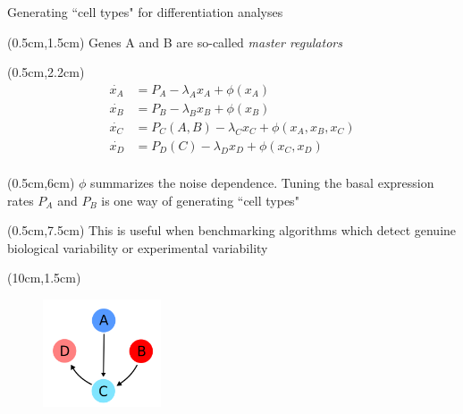 \documentclass[aspectratio=1610]{beamer}					%
\begin{document}
\begin{frame}{Generating ``cell types" for differentiation analyses}

\begin{textblock*}{10cm}(0.5cm,1.5cm)
Genes A and B are so-called \emph{master regulators}
\end{textblock*}

\begin{textblock*}{10cm}(0.5cm,2.2cm)
\begin{align*}
\dot{x_{A}} &= P_{A} -\lambda_{A}x_{A} + \phi(x_{A})\\
\dot{x_{B}} &= P_{B} -\lambda_{B}x_{B} + \phi(x_{B})\\
\dot{x_{C}} &= P_{C}(A,B) -\lambda_{C}x_{C} + \phi(x_{A},x_{B},x_{C})\\
\dot{x_{D}} &= P_{D}(C) -\lambda_{D}x_{D} + \phi(x_{C},x_{D})\\
\end{align*}
\end{textblock*}

\begin{textblock*}{15cm}(0.5cm,6cm)
$\phi$ summarizes the noise dependence. Tuning the basal expression rates $P_{A}$ and $P_{B}$ is one way of generating ``cell types"
\end{textblock*}

\begin{textblock*}{15cm}(0.5cm,7.5cm)
This is useful when benchmarking algorithms which detect genuine biological variability or experimental variability
\end{textblock*}


\begin{textblock*}{3.5cm}(10cm,1.5cm)
\begin{figure}
\includegraphics[width=3.5cm]{master.png}
\end{figure}
\end{textblock*}

\end{frame}
\end{document}
